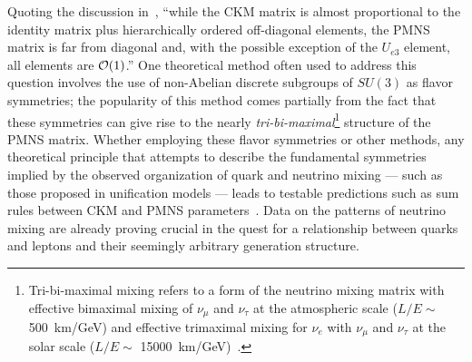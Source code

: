 Quoting the discussion in~\cite{deGouvea:2013onf}, ``while the CKM
matrix is almost proportional to the identity matrix plus
hierarchically ordered off-diagonal elements, the PMNS matrix is far
from diagonal and, with the possible exception of the $U_{e3}$
element, all elements are ${\cal O}(1)$.''
One theoretical method often used to address this question involves the use of non-Abelian discrete
subgroups of $SU(3)$ as flavor symmetries; the popularity of this method comes partially from
the fact that these symmetries can give rise to the nearly \emph{tri-bi-maximal}\footnote{Tri-bi-maximal mixing refers to a form of the neutrino mixing matrix with effective bimaximal mixing of $\nu_\mu$ and $\nu_\tau$
at the atmospheric scale ($L/E \sim$ \SI{500}{\km / \GeV}) and effective trimaximal
mixing for $\nu_e$ with $\nu_\mu$ and $\nu_\tau$ 
at the solar scale ($L/E \sim$ \SI{15000}{\km / \GeV})~\cite{Harrison:2002er}.} 
structure of the PMNS matrix.
Whether employing these flavor symmetries or other methods,
any theoretical principle that attempts to describe the fundamental
symmetries implied by the observed organization of quark and neutrino
mixing --- such as those proposed in unification models --- leads to
testable predictions such as sum rules between CKM and PMNS
parameters~\cite{deGouvea:2013onf,Mohapatra:2005wg,King:2014nza,Albright:2006cw}.
Data on the patterns of neutrino mixing 
are already proving crucial in the quest for a 
relationship between quarks and leptons and their seemingly arbitrary generation
structure.  

